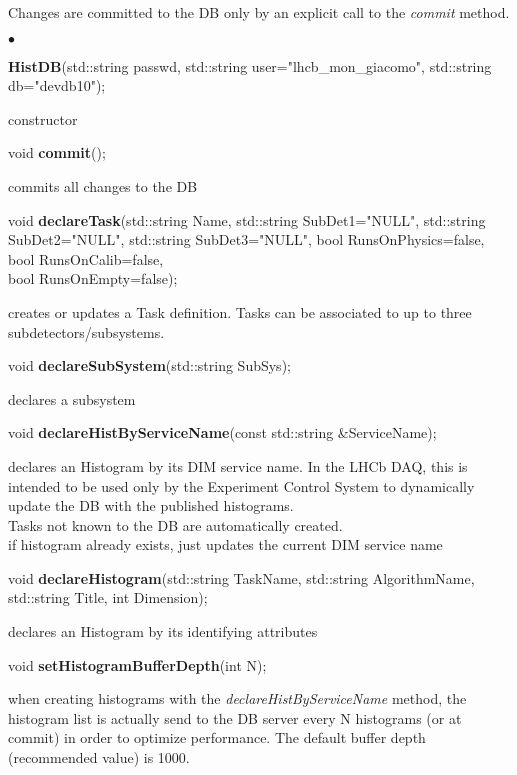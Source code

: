\documentclass{lhcbnote}
\begin{document}
Changes are committed to the DB only by an explicit call to the {\it
commit} method.

\begin{list}{$\bullet$}{}
\item {\bf HistDB}(std::string passwd, 
		std::string user="lhcb\_mon\_giacomo", 
		std::string db="devdb10");

constructor

\item void {\bf commit}();

commits all changes to the DB


\item void {\bf declareTask}(std::string Name, 
		   std::string SubDet1="NULL", 
		   std::string SubDet2="NULL", 
		   std::string SubDet3="NULL",
		   bool RunsOnPhysics=false, 
		   bool RunsOnCalib=false,\\ 
		   bool RunsOnEmpty=false);

creates or updates a Task definition. Tasks can be associated to up to
three subdetectors/subsystems. 


\item   void {\bf declareSubSystem}(std::string SubSys);

declares a  subsystem

\item   void {\bf declareHistByServiceName}(const std::string \&ServiceName);

declares an Histogram by its DIM service name. In the LHCb
DAQ, this is intended to be used only by the Experiment Control
System to dynamically update the DB with the published histograms.\\
Tasks not known to the DB are automatically created.\\
if histogram already exists, just updates the current DIM service name 


\item void {\bf declareHistogram}(std::string TaskName, 
			std::string AlgorithmName, 
			std::string Title, 
			int Dimension); 

declares an Histogram by its identifying attributes

\item void {\bf setHistogramBufferDepth}(int N);

when creating histograms with the {\it declareHistByServiceName}
method, the histogram list is actually send to the DB server every N
histograms (or at commit) in order to optimize performance. The
default buffer depth (recommended value) is 1000.  


\end{list}
\end{document}
